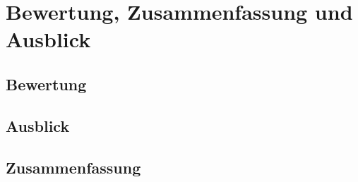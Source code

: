 
\chapter{Bewertung, Zusammenfassung und Ausblick}


\section{Bewertung}
\section{Ausblick}
\section{Zusammenfassung}

